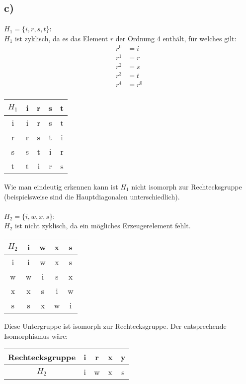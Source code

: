 \documentclass[a4paper]{scrartcl}
\begin{document}
	\subsection{c)}
		\(H_1=\{i,r,s,t\}\): \\
		\(H_1\) ist zyklisch, da es das Element \(r\) der Ordnung 4 enthält, für welches gilt: \\
		\begin{align}
			r^0&= i \\
			r^1&= r \\
			r^2&= s \\
			r^3&= t \\
			r^4&= r^0 \\
		\end{align}
		\begin{center}
			\begin{tabular}{c||c|c|c|c}
				\(H_1\)&i&r&s&t \\ \hline\hline
				i &i&r&s&t\\ \hline
				r &r&s&t&i\\ \hline	
				s &s&t&i&r\\ \hline
				t &t&i&r&s\\ 
			\end{tabular} 
		\end{center}
		Wie man eindeutig erkennen kann ist \(H_1\) nicht isomorph zur Rechtecksgruppe 
		(beispielsweise sind die Hauptdiagonalen unterschiedlich). \\ \\
		\(H_2=\{i,w,x,s\}\):\\
		\(H_2\) ist nicht zyklisch, da ein mögliches Erzeugerelement fehlt.
		\begin{center}
			\begin{tabular}{c||c|c|c|c}
				\(H_2\)&i&w&x&s \\ \hline\hline
				i &i&w&x&s \\ \hline
				w &w&i&s&x \\ \hline	
				x &x&s&i&w  \\ \hline
				s &s&x&w&i \\ 
			\end{tabular} 
		\end{center}
		Diese Untergruppe ist isomorph zur Rechtecksgruppe. Der entsprechende Isomorphismus wäre:
		\begin{tabular}{c||c|c|c|c}
			Rechtecksgruppe &i&r&x&y\\ \hline
			\(H_2\) & i	& w & x & s
		\end{tabular}
	
\end{document}
